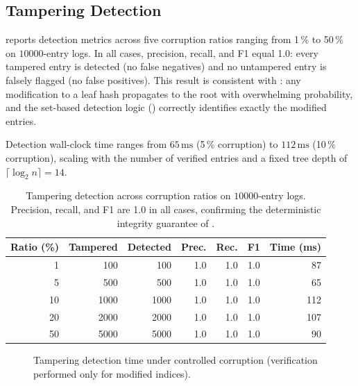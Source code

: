\documentclass[preprint,12pt]{elsarticle}
\begin{document}
\subsection{Tampering Detection}
\label{sec:tamper_results}

 reports detection metrics across five corruption ratios ranging from 1\,\% to 50\,\% on $10000$-entry logs.
In all cases, precision, recall, and F1 equal 1.0: every tampered entry is detected (no false negatives) and no untampered entry is falsely flagged (no false positives).
This result is consistent with : any modification to a leaf hash propagates to the root with overwhelming probability, and the set-based detection logic () correctly identifies exactly the modified entries.

Detection wall-clock time ranges from $65\,\mathrm{ms}$ (5\,\% corruption) to $112\,\mathrm{ms}$ (10\,\% corruption), scaling with the number of verified entries and a fixed tree depth of $\lceil \log_2 n \rceil = 14$.

\begin{table}[t]
\centering
\caption{Tampering detection across corruption ratios on $10000$-entry logs.
Precision, recall, and F1 are 1.0 in all cases, confirming the deterministic integrity guarantee of .}
\label{tab:tampering}
\small
\renewcommand{\arraystretch}{1.2}
\begin{tabular}{r
  r
  r
  r
  r
  r
  r}
\toprule
{\textbf{Ratio (\%)}} &
{\textbf{Tampered}} &
{\textbf{Detected}} &
{\textbf{Prec.}} &
{\textbf{Rec.}} &
{\textbf{F1}} &
{\textbf{Time (ms)}} \\
\midrule
  1 &   100 &   100 & 1.0 & 1.0 & 1.0 &  87 \\
  5 &   500 &   500 & 1.0 & 1.0 & 1.0 &  65 \\
 10 &  1000 &  1000 & 1.0 & 1.0 & 1.0 & 112 \\
 20 &  2000 &  2000 & 1.0 & 1.0 & 1.0 & 107 \\
 50 &  5000 &  5000 & 1.0 & 1.0 & 1.0 &  90 \\
\bottomrule
\end{tabular}
\end{table}

\begin{figure}[t]
\centering
{}
\caption{Tampering detection time under controlled corruption (verification performed only for modified indices).}
\label{fig:tampering_time}
\end{figure}
\end{document}
